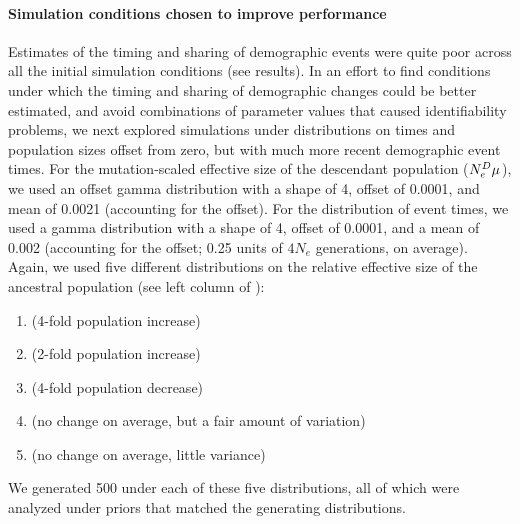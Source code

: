 \paragraph{Simulation conditions chosen to improve performance}

Estimates of the timing and sharing of demographic events were quite poor
across all the initial simulation conditions (see results).
In an effort to find conditions under which the timing and sharing of
demographic changes could be better estimated, and avoid combinations
of parameter values that caused identifiability problems,
we next explored simulations under distributions on times and population sizes
offset from zero, but with much more recent demographic event times.
For the mutation-scaled effective size of the descendant
population
($\epopsize[\descendantpopindex{}]\murate$),
we used an offset gamma distribution with a shape of 4, offset of 0.0001, and
mean of 0.0021 (accounting for the offset).
For the distribution of event times, we used a gamma distribution
with a shape of 4, offset of 0.0001, and a mean of 0.002 (accounting
for the offset; 0.25 units of $4N_e$ generations, on average).
Again, we used five different distributions on the relative effective size of
the ancestral population (see left column of
\figs
{}):
\begin{enumerate}[label=B.\arabic*]
    \item {} (4-fold population increase) \label{sims:optimalFourFoldIncrease}
    \item {} (2-fold population increase)  \label{sims:optimalTwoFoldIncrease}
    \item {} (4-fold population decrease)    \label{sims:optimalFourFoldDecrease}
    \item {} (no change on average, but a fair amount of variation) \label{sims:optimalCenter}
    \item {} (no change on average, little variance) \label{sims:optimalCenterNarrow}
\end{enumerate}
We generated 500 \datasets under each of these five distributions, all of which
were analyzed under priors that matched the generating distributions.

